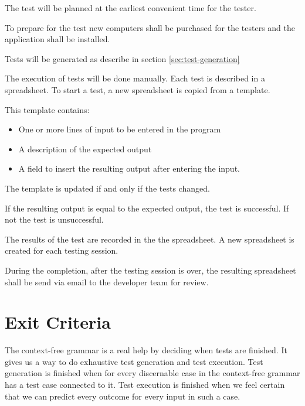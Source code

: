 \documentclass[11pt,a4paper]{article}
\begin{document}
The test will be planned at the earliest convenient time for the
tester.

To prepare for the test new computers shall be purchased for the
testers and the application shall be installed.

Tests will be generated as describe in section \ref{sec:test-generation}

The execution of tests will be done manually. Each test is described
in a spreadsheet. To start a test, a new spreadsheet is copied from a
template.

This template contains:

\begin{itemize}
\item One or more lines of input to be entered in the program
\item A description of the expected output %
\item A field to insert the resulting output after entering the input.
\end{itemize}

The template is updated if and only if the tests  changed.

If the resulting output is equal to the expected output, the test is
successful. If not the test is unsuccessful.

The results of the test are recorded in the the spreadsheet. A new
spreadsheet is created for each testing session.

During the completion, after the testing session is over, the resulting spreadsheet shall be
send via email to the developer team for review.


\section{Exit Criteria}

The context-free grammar is a real help by deciding when tests are
finished. It gives us a way to do exhaustive test generation and test
execution. Test generation is finished when for every discernable case
in the context-free grammar has a test case connected to it. Test
execution is finished when we feel certain that we can predict every
outcome for every input in such a case.
\end{document}
